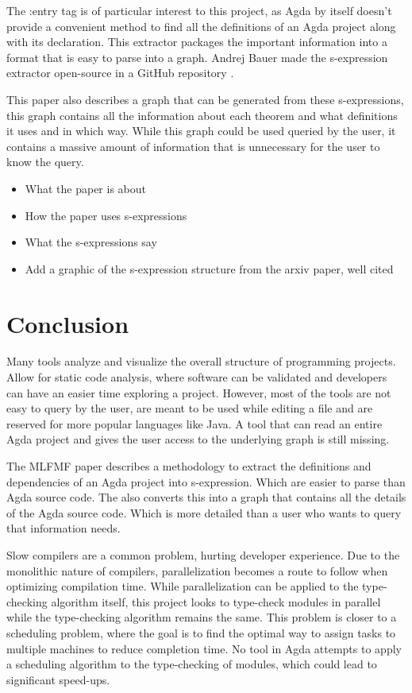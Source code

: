 The :entry tag is of particular interest to this project, as Agda by itself
doesn't provide a convenient method to find all the definitions of an Agda
project along with its declaration. This extractor packages the important
information into a format that is easy to parse into a graph. Andrej Bauer made
the s-expression extractor open-source in a GitHub repository \cite{andrej}.

This paper also describes a graph that can be generated from these
s-expressions, this graph contains all the information about each theorem and
what definitions it uses and in which way. While this graph could be used
queried by the user, it contains a massive amount of information that is
unnecessary for the user to know the query.

\begin{itemize}
\item What the paper is about 
\item How the paper uses s-expressions 
\item What the s-expressions say 
\item Add a graphic of the s-expression structure from the arxiv paper, well cited
\end{itemize}

\section{Conclusion}

Many tools analyze and visualize the overall structure of
programming projects. Allow for static code analysis, where software can be
validated and developers can have an easier time exploring a project. However,
most of the tools are not easy to query by the user, are meant to be used while
editing a file and are reserved for more popular languages like Java. A
tool that can read an entire Agda project and gives the user access to
the underlying graph is still missing.

The MLFMF paper \cite{bauer2023mlfmf} describes a methodology to extract the
definitions and dependencies of an Agda project into s-expression. Which are
easier to parse than Agda source code. The also converts this into a graph that
contains all the details of the Agda source code. Which is more detailed than a
user who wants to query that information needs.

Slow compilers are a common problem, hurting developer experience. Due to the
monolithic nature of compilers, parallelization becomes a route to follow when
optimizing compilation time. While parallelization can be applied to the
type-checking algorithm itself, this project looks to type-check modules in
parallel while the type-checking algorithm remains the same. This problem is
closer to a scheduling problem, where the goal is to find the optimal way to
assign tasks to multiple machines to reduce completion time. No tool
in Agda attempts to apply a scheduling algorithm to the type-checking of
modules, which could lead to significant speed-ups.  


